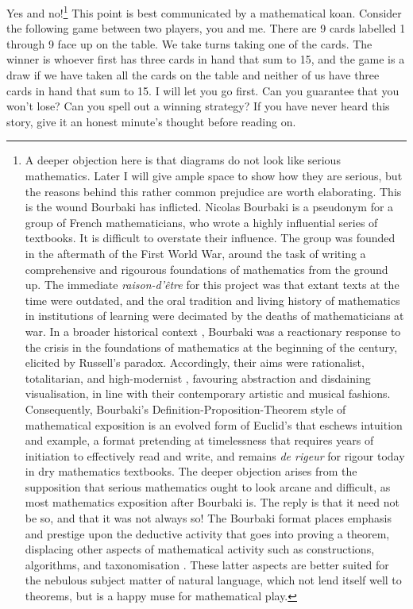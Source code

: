Yes and no!\footnote{A deeper objection here is that diagrams do not look like serious mathematics. Later I will give ample space to show how they are serious, but the reasons behind this rather common prejudice are worth elaborating. This is the wound Bourbaki has inflicted. Nicolas Bourbaki is a pseudonym for a group of French mathematicians, who wrote a highly influential series of textbooks. It is difficult to overstate their influence. The group was founded in the aftermath of the First World War, around the task of writing a comprehensive and rigourous foundations of mathematics from the ground up. The immediate \emph{raison-d'\^{e}tre} for this project was that extant texts at the time were outdated, and the oral tradition and living history of mathematics in institutions of learning were decimated by the deaths of mathematicians at war. In a broader historical context \citep{}, Bourbaki was a reactionary response to the crisis in the foundations of mathematics at the beginning of the century, elicited by Russell's paradox. Accordingly, their aims were rationalist, totalitarian, and high-modernist \citep{}, favouring abstraction and disdaining visualisation, in line with their contemporary artistic and musical fashions. Consequently, Bourbaki's Definition-Proposition-Theorem style of mathematical exposition is an evolved form of Euclid's that eschews intuition and example, a format pretending at timelessness that requires years of initiation to effectively read and write, and remains \emph{de rigeur} for rigour today in dry mathematics textbooks. The deeper objection arises from the supposition that serious mathematics ought to look arcane and difficult, as most mathematics exposition after Bourbaki is. The reply is that it need not be so, and that it was not always so! The Bourbaki format places emphasis and prestige upon the deductive activity that goes into proving a theorem, displacing other aspects of mathematical activity such as constructions, algorithms, and taxonomisation \citep{}. These latter aspects are better suited for the nebulous subject matter of natural language, which not lend itself well to theorems, but is a happy muse for mathematical play.} This point is best communicated by a mathematical koan. Consider the following game between two players, you and me. There are 9 cards labelled 1 through 9 face up on the table. We take turns taking one of the cards. The winner is whoever first has three cards in hand that sum to 15, and the game is a draw if we have taken all the cards on the table and neither of us have three cards in hand that sum to 15. I will let you go first. Can you guarantee that you won't lose? Can you spell out a winning strategy? If you have never heard this story, give it an honest minute's thought before reading on.\\

